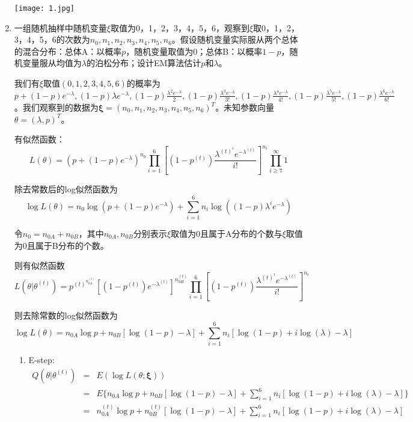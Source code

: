 \documentclass{ctexart}
\begin{document}
\begin{enumerate}
\centerline{\texttt{[image: 1.jpg]}}




\item
一组随机抽样中随机变量\(\xi\)取值为0，1，2，3，4，5，6，观察到\(\xi\)取0，1，2，3，4，5，6的次数为\(n_0,n_1,n_2,n_3,n_4,n_5,n_6\)。假设随机变量实际服从两个总体的混合分布：总体A：以概率\(p\)，随机变量取值为0；总体B：以概率\(1-p\)，随机变量服从均值为\(\lambda\)的泊松分布；设计EM算法估计\(p\)和\(\lambda\)。


  我们有\(\xi\)取值\((0,1,2,3,4,5,6)\)的概率为\(
p+(1-p) e^{-\lambda} ,
(1-p) \lambda e^{-\lambda}, 
(1-p)\frac{\lambda^2 e^{-\lambda}}{2}, 
(1-p)\frac{\lambda^3 e^{-\lambda}}{3!} , 
(1-p)\frac{\lambda^4 e^{-\lambda}}{4!}, 
(1-p)\frac{\lambda^5 e^{-\lambda}}{5!},
(1-p)\frac{\lambda^6 e^{-\lambda}}{6!}  
\)。我们观察到的数据为\(\bm{\xi}=(n_0,n_1,n_2,n_3,n_4,n_5,n_6)^T\)。未知参数向量\(\theta=(\lambda,p)^T\)。

有似然函数：
\[L(\theta)=(p+(1-p)e^{-\lambda})^{n_0} \prod_{i=1}^6 [(1-p^{(t)})\frac{\lambda^{(t)^i} e^{-\lambda^{(t)}}}{i!}]^{n_i}\prod_{i \geq 7}^{\infty} 1\]

除去常数后的log似然函数为
\[
\log L(\theta)=n_0 \log(p+(1-p) e^{-\lambda})+\sum_{i=1}^6 n_i\log((1-p)\lambda^ie^{-\lambda})\]



令\(n_0=n_{0A}+n_{0B}\)，其中\(n_{0A},n_{0B}\)分别表示\(\xi\)取值为0且属于A分布的个数与\(\xi\)取值为0且属于B分布的个数。

则有似然函数
\[L(\theta | \theta^{(t)})=p^{(t)^{n_{0A}^{(t)}} }[(1-p^{(t)})e^{-\lambda^{(t)}}]^{n_{0B}^{(t)}}  \prod_{i=1}^6 [(1-p^{(t)})\frac{\lambda^{(t)^i} e^{-\lambda^{(t)}}}{i!}]^{n_i}\]





则去除常数的log似然函数为
\[\log L(\theta) =n_{0A} \log p +n_{0B}[\log(1-p)-\lambda]+\sum_{i=1}^6 n_i [\log(1-p)+i \log( \lambda)-\lambda] \]

\begin{enumerate}
\item E-step:
\begin{eqnarray*}
Q(\theta|\theta^{(t)})&=&E(\log L(\theta;\bm{\xi})) \\
&=& E\{ n_{0A} \log p +n_{0B}[\log(1-p)-\lambda] + \sum_{i=1}^6 n_i[\log (1-p)+i \log(\lambda)-\lambda]\}\\
&=& n_{0A}^{(t)} \log p +n_{0B}^{(t)}  [\log(1-p)-\lambda] +\sum_{i=1}^6 n_i[ \log (1-p)+i \log(\lambda)-\lambda]
\end{eqnarray*}


\end{enumerate}
\end{enumerate}
\end{document}
